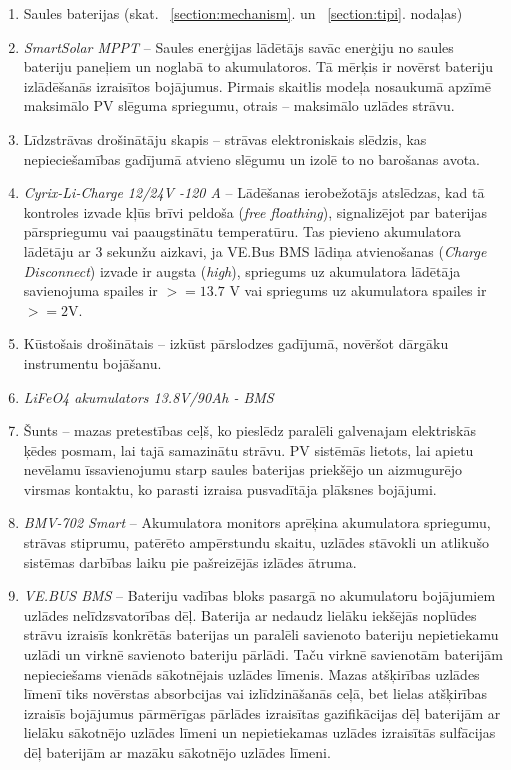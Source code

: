 \begin{enumerate}
\item Saules baterijas (skat. ~\ref{section:mechanism}. un ~\ref{section:tipi}. nodaļas)
\item \emph{SmartSolar MPPT} --
Saules enerģijas lādētājs savāc enerģiju no saules bateriju paneļiem un noglabā to akumulatoros. Tā mērķis ir novērst bateriju izlādēšanās izraisītos bojājumus. Pirmais skaitlis modeļa nosaukumā apzīmē maksimālo PV slēguma spriegumu, otrais -- maksimālo uzlādes strāvu.
\item Līdzstrāvas drošinātāju skapis --
strāvas elektroniskais slēdzis, kas nepieciešamības gadījumā atvieno slēgumu un izolē to no barošanas avota.
\item \emph{Cyrix-Li-Charge 12/24V -120 A} --
Lādēšanas ierobežotājs atslēdzas, kad tā kontroles izvade kļūs brīvi peldoša (\textit{free floathing}), signalizējot par baterijas pārspriegumu vai paaugstinātu temperatūru. Tas pievieno akumulatora lādētāju ar 3 sekunžu aizkavi, ja VE.Bus BMS lādiņa atvienošanas (\textit{Charge Disconnect}) izvade ir augsta (\textit{high}), spriegums uz akumulatora lādētāja savienojuma spailes ir $>= 13.7$ V vai spriegums uz akumulatora spailes ir $>= 2$V.
\item Kūstošais drošinātais --
izkūst pārslodzes gadījumā, novēršot dārgāku instrumentu bojāšanu.
\item \emph{LiFeO4 akumulators 13.8V/90Ah - BMS}
\item Šunts -- mazas pretestības ceļš, ko pieslēdz paralēli galvenajam elektriskās ķēdes posmam, lai tajā samazinātu strāvu. PV sistēmās lietots, lai apietu nevēlamu īssavienojumu starp saules baterijas priekšējo un aizmugurējo virsmas kontaktu, ko parasti izraisa pusvadītāja plāksnes bojājumi.
\item \emph{BMV-702 Smart} --
Akumulatora monitors aprēķina akumulatora spriegumu, strāvas stiprumu, patērēto ampērstundu skaitu, uzlādes stāvokli un atlikušo sistēmas darbības laiku pie pašreizējās izlādes ātruma.
\item \emph{VE.BUS BMS} --
Bateriju vadības bloks pasargā no akumulatoru bojājumiem uzlādes nelīdzsvatorības dēļ. Baterija ar nedaudz lielāku iekšējās noplūdes strāvu
izraisīs konkrētās baterijas un paralēli savienoto bateriju nepietiekamu uzlādi un virknē savienoto bateriju pārlādi. Taču virknē savienotām baterijām nepieciešams vienāds sākotnējais uzlādes līmenis. Mazas atšķirības uzlādes līmenī tiks novērstas absorbcijas vai izlīdzināšanās ceļā, bet lielas atšķirības izraisīs bojājumus pārmērīgas pārlādes izraisītas gazifikācijas dēļ baterijām ar lielāku sākotnējo uzlādes līmeni un nepietiekamas uzlādes izraisītās sulfācijas dēļ baterijām ar mazāku sākotnējo uzlādes līmeni.


\end{enumerate}
